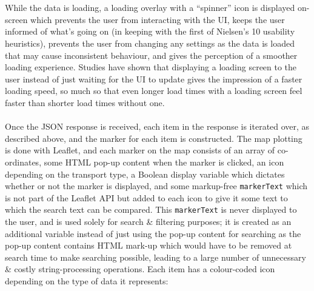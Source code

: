 \documentclass[a4paper,11pt]{report}
\begin{document}
\\\\
While the data is loading, a loading overlay with a ``spinner'' icon is displayed on-screen which prevents the user from interacting with the UI, keeps the user informed of what's going on (in keeping with the first of Nielsen's 10 usability heuristics\supercite{nielsenheuristics}), prevents the user from changing any settings as the data is loaded that may cause inconsistent behaviour, and gives the perception of a smoother loading experience.
Studies have shown that displaying a loading screen to the user instead of just waiting for the UI to update gives the impression of a faster loading speed, so much so that even longer load times with a loading screen feel faster than shorter load times without one\supercite{mdnperceivedperformance, persson2019perceived, Vladic2020LoadingAnimations}.
\\\\
Once the JSON response is received, each item in the response is iterated over, as described above, and the marker for each item is constructed.
The map plotting is done with Leaflet\supercite{leaflet}, and each marker on the map consists of an array of co-ordinates, some HTML pop-up content when the marker is clicked, an icon depending on the transport type, a Boolean display variable which dictates whether or not the marker is displayed, and some markup-free \texttt{markerText} which is not part of the Leaflet API\supercite{leaflet} but added to each icon to give it some text to which the search text can be compared.
This \texttt{markerText} is never displayed to the user, and is used solely for search \& filtering purposes;
it is created as an additional variable instead of just using the pop-up content for searching as the pop-up content contains HTML mark-up which would have to be removed at search time to make searching possible, leading to a large number of unnecessary \& costly string-processing operations.
Each item has a colour-coded icon depending on the type of data it represents:
\end{document}
